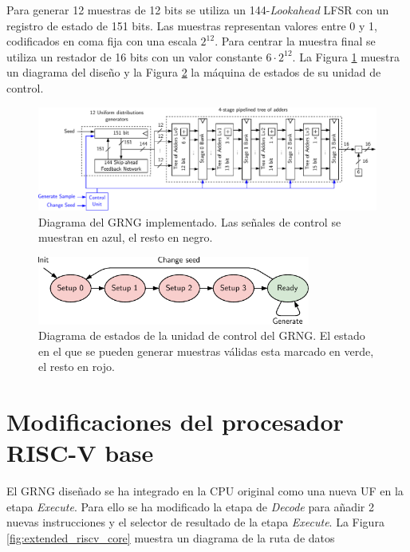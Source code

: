 Para generar 12 muestras de 12 bits se utiliza un 144-\textit{Lookahead} LFSR con un registro de estado de 151 bits. Las muestras representan valores entre 0 y 1, codificados en coma fija con una escala $2^{12}$. Para centrar la muestra final se utiliza un restador de 16 bits con un valor constante $6 \cdot 2^{12}$. La Figura \ref{fig:grng} muestra un diagrama del diseño y la Figura \ref{fig:grng_state} la máquina de estados de su unidad de control.

\begin{figure}[h]
    \centering
    \includegraphics[width=\textwidth]{root/Imagenes/5_riscv/grng.pdf}
    \caption{Diagrama del GRNG implementado. Las señales de control se muestran en azul, el resto en negro.}
    \label{fig:grng}
\end{figure}

\begin{figure}[h]
    \centering
    \includegraphics[width=0.8\textwidth]{root/Imagenes/5_riscv/grng_states.pdf}
    \caption{Diagrama de estados de la unidad de control del GRNG. El estado en el que se pueden generar muestras válidas esta marcado en verde, el resto en rojo.}
    \label{fig:grng_state}
\end{figure}

\section{Modificaciones del procesador RISC-V base}

El GRNG diseñado se ha integrado en la CPU original como una nueva UF en la etapa \textit{Execute}. Para ello se ha modificado la etapa de \textit{Decode} para añadir 2 nuevas instrucciones y el selector de resultado de la etapa \textit{Execute}. La Figura \ref{fig:extended_riscv_core} muestra un diagrama de la ruta de datos 

